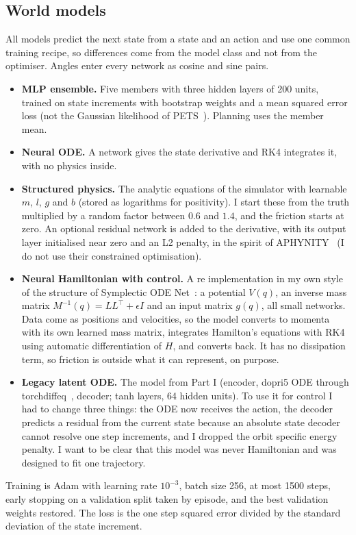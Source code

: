 \documentclass[11pt,a4paper]{article}
\begin{document}
\subsection{World models}
All models predict the next state from a state and an action and use one common training recipe, so differences come from the model class and not from the optimiser. Angles enter every network as cosine and sine pairs.
\begin{itemize}[leftmargin=1.5em]
\item \textbf{MLP ensemble.} Five members with three hidden layers of 200 units, trained on state increments with bootstrap weights and a mean squared error loss (not the Gaussian likelihood of PETS~\cite{chua2018pets}). Planning uses the member mean.
\item \textbf{Neural ODE.} A network gives the state derivative and RK4 integrates it, with no physics inside.
\item \textbf{Structured physics.} The analytic equations of the simulator with learnable $m$, $l$, $g$ and $b$ (stored as logarithms for positivity). I start these from the truth multiplied by a random factor between $0.6$ and $1.4$, and the friction starts at zero. An optional residual network is added to the derivative, with its output layer initialised near zero and an L2 penalty, in the spirit of APHYNITY~\cite{yin2021aphynity} (I do not use their constrained optimisation).
\item \textbf{Neural Hamiltonian with control.} A re implementation in my own style of the structure of Symplectic ODE Net~\cite{zhong2020symoden}: a potential $V(q)$, an inverse mass matrix $M^{-1}(q)=LL^\top+\epsilon I$ and an input matrix $g(q)$, all small networks. Data come as positions and velocities, so the model converts to momenta with its own learned mass matrix, integrates Hamilton's equations with RK4 using automatic differentiation of $H$, and converts back. It has no dissipation term, so friction is outside what it can represent, on purpose.
\item \textbf{Legacy latent ODE.} The model from Part I (encoder, dopri5 ODE through torchdiffeq~\cite{chen2018neuralode}, decoder; tanh layers, 64 hidden units). To use it for control I had to change three things: the ODE now receives the action, the decoder predicts a residual from the current state because an absolute state decoder cannot resolve one step increments, and I dropped the orbit specific energy penalty. I want to be clear that this model was never Hamiltonian and was designed to fit one trajectory.
\end{itemize}
Training is Adam with learning rate $10^{-3}$, batch size 256, at most 1500 steps, early stopping on a validation split taken by episode, and the best validation weights restored. The loss is the one step squared error divided by the standard deviation of the state increment.
\end{document}
